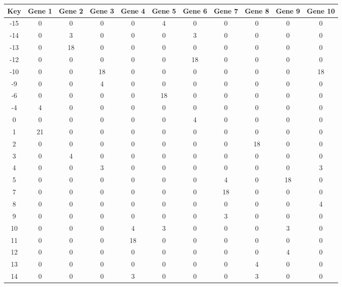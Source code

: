 \begin{tabular}{|c|c|c|c|c|c|c|c|c|c|c|}
\hline
Key & Gene 1 & Gene 2 & Gene 3 & Gene 4 & Gene 5 & Gene 6 & Gene 7 & Gene 8 & Gene 9 & Gene 10 \\
\hline
-15 & 0 & 0 & 0 & 0 & 4 & 0 & 0 & 0 & 0 & 0 \\
-14 & 0 & 3 & 0 & 0 & 0 & 3 & 0 & 0 & 0 & 0 \\
-13 & 0 & 18 & 0 & 0 & 0 & 0 & 0 & 0 & 0 & 0 \\
-12 & 0 & 0 & 0 & 0 & 0 & 18 & 0 & 0 & 0 & 0 \\
-10 & 0 & 0 & 18 & 0 & 0 & 0 & 0 & 0 & 0 & 18 \\
-9 & 0 & 0 & 4 & 0 & 0 & 0 & 0 & 0 & 0 & 0 \\
-6 & 0 & 0 & 0 & 0 & 18 & 0 & 0 & 0 & 0 & 0 \\
-4 & 4 & 0 & 0 & 0 & 0 & 0 & 0 & 0 & 0 & 0 \\
0 & 0 & 0 & 0 & 0 & 0 & 4 & 0 & 0 & 0 & 0 \\
1 & 21 & 0 & 0 & 0 & 0 & 0 & 0 & 0 & 0 & 0 \\
2 & 0 & 0 & 0 & 0 & 0 & 0 & 0 & 18 & 0 & 0 \\
3 & 0 & 4 & 0 & 0 & 0 & 0 & 0 & 0 & 0 & 0 \\
4 & 0 & 0 & 3 & 0 & 0 & 0 & 0 & 0 & 0 & 3 \\
5 & 0 & 0 & 0 & 0 & 0 & 0 & 4 & 0 & 18 & 0 \\
7 & 0 & 0 & 0 & 0 & 0 & 0 & 18 & 0 & 0 & 0 \\
8 & 0 & 0 & 0 & 0 & 0 & 0 & 0 & 0 & 0 & 4 \\
9 & 0 & 0 & 0 & 0 & 0 & 0 & 3 & 0 & 0 & 0 \\
10 & 0 & 0 & 0 & 4 & 3 & 0 & 0 & 0 & 3 & 0 \\
11 & 0 & 0 & 0 & 18 & 0 & 0 & 0 & 0 & 0 & 0 \\
12 & 0 & 0 & 0 & 0 & 0 & 0 & 0 & 0 & 4 & 0 \\
13 & 0 & 0 & 0 & 0 & 0 & 0 & 0 & 4 & 0 & 0 \\
14 & 0 & 0 & 0 & 3 & 0 & 0 & 0 & 3 & 0 & 0 \\
\hline
\end{tabular}